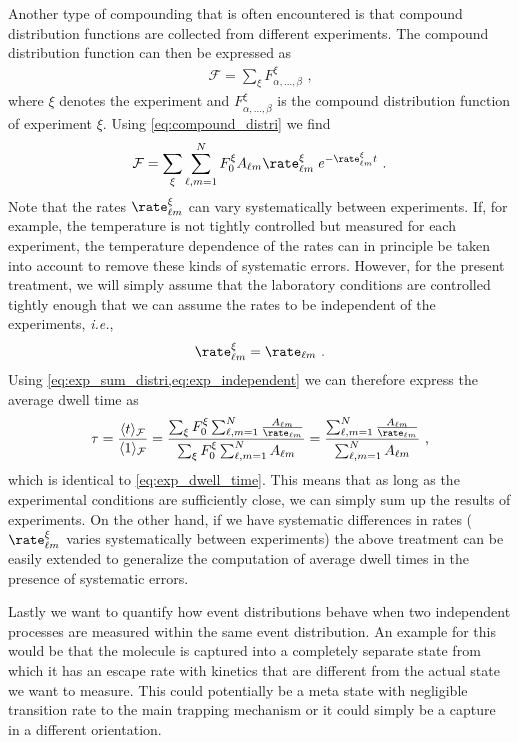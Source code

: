 Another type of compounding that is often encountered is that compound distribution functions are collected
from different experiments. The compound distribution function can then be expressed as
%
\begin{align*}
    \mathcal{F} = \sum_\xi F^{\xi}_{\alpha,\dots,\beta}
    \text{ ,}
\end{align*}
%
where $\xi$ denotes the experiment and $F^{\xi}_{\alpha,\dots,\beta}$ is the compound distribution function of
experiment $\xi$. Using \cref{eq:compound_distri} we find
%
\begin{align}\label{eq:exp_sum_distri}
    \mathcal{F} = \sum_\xi\sum_{\ell, m=1}^N F_0^\xi A_{\ell m}\rate^{\xi} _{\ell m}
    \;e^{-\rate^\xi_{\ell m} t}
    \text{ .}
\end{align}
%
Note that the rates $\rate^\xi_{\ell m}$ can vary systematically between experiments. If, for example, the
temperature is not tightly controlled but measured for each experiment, the temperature dependence of the
rates can in principle be taken into account to remove these kinds of systematic errors. However, for the
present treatment, we will simply assume that the laboratory conditions are controlled tightly enough that we
can assume the rates to be independent of the experiments, \textit{i.e.},
%
\begin{align}\label{eq:exp_independent}
   \rate^\xi_{\ell m} = \rate_{\ell m}
   \text{ .}
\end{align}
%
Using \cref{eq:exp_sum_distri,eq:exp_independent} we can therefore express the average dwell time as
%
\begin{align*}
    \tau = \frac{\langle t\rangle_{\mathcal{F}}}{\langle 1\rangle_{\mathcal{F}}}
    =\frac{\sum_\xi F^\xi_{0}\sum_{\ell, m=1}^N \frac{A_{\ell m} }{\rate_{\ell
        m}}}{\sum_\xi F^\xi_{0}\sum_{\ell, m=1}^N A_{\ell m}}
    = \frac{\sum_{\ell, m=1}^N \frac{A_{\ell m} }{\rate_{\ell m}}}{%
        \sum_{\ell, m=1}^N A_{\ell m}}
    \text{ ,}
\end{align*}
%
which is identical to \cref{eq:exp_dwell_time}. This means that as long as the experimental conditions are
sufficiently close, we can simply sum up the results of experiments. On the other hand, if we have systematic
differences in rates (\ie~$\rate^\xi_{\ell m}$ varies systematically between experiments) the above treatment
can be easily extended to generalize the computation of average dwell times in the presence of systematic
errors.

Lastly we want to quantify how event distributions behave when two independent processes are measured within
the same event distribution. An example for this would be that the molecule is captured into a completely
separate state from which it has an escape rate with kinetics that are different from the actual state we want
to measure. This could potentially be a meta state with negligible transition rate to the main trapping
mechanism or it could simply be a capture in a different orientation.

